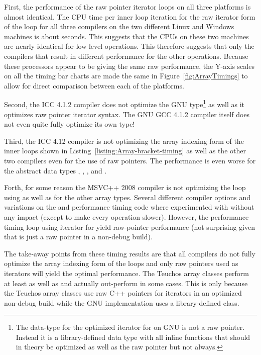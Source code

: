 \documentclass[pdf,ps2pdf,11pt]{SANDreport}
\begin{document}
First, the performance of the raw pointer iterator loops on all three
platforms is almost identical.  The CPU time per inner loop iteration
for the raw iterator form of the loop for all three compilers on the
two different Linux and Windows machines is about {}
seconds.  This suggests that the CPUs on these two machines are nearly
identical for low level operations.  This therefore suggests that only
the compilers that result in different performance for the other
operations.  Because these processors appear to be giving the same raw
performance, the Y-axis scales on all the timing bar charts are made
the same in Figure~\ref{fig:ArrayTimings} to allow for direct
comparison between each of the platforms.

Second, the ICC 4.1.2 compiler does not optimize the GNU
{} type\footnote{The data-type for the
optimized iterator for {} on GNU is not
a raw pointer.  Instead it is a library-defined data type with all
inline functions that should in theory be optimized as well as the raw
pointer but not always.} as well as it optimizes raw pointer iterator
syntax.  The GNU GCC 4.1.2 compiler itself does not even quite fully
optimize its own {} type!

Third, the ICC 4.12 compiler is not optimizing the array indexing form
of the inner loops shown in Listing~\ref{listing:Array-bracket-timing}
as well as the other two compilers even for the use of raw pointers.
The performance is even worse for the abstract data types
{}, {}, {}, and
{}.

Forth, for some reason the MSVC++ 2008 compiler is not optimizing the
loop using {} as well as for the
other array types.  Several different compiler options and variations
on the {} and performance timing code where experimented
with without any impact (except to make every operation slower).
However, the performance timing loop using iterator for
{} yield raw-pointer performance (not surprising given
that {} is just a raw pointer in a non-debug
build).

The take-away points from these timing results are that all compilers
do not fully optimize the array indexing form of the loops and only
raw pointers used as iterators will yield the optimal performance.
The Teuchos array classes perform at least as well as
{} and actually out-perform {} in
some cases.  This is only because the Teuchos array classes use raw
C++ pointers for iterators in an optimized non-debug build while the
GNU implementation {} uses a library-defined class.
\end{document}
